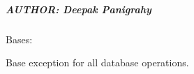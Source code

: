 \documentclass[letterpaper,10pt,english]{sphinxmanual}
\begin{document}
\subparagraph{AUTHOR: Deepak Panigrahy}
\label{\detokenize{core.database.base:author-deepak-panigrahy}}

\begin{fulllineitems}
\label{\detokenize{core.database.base:core.database.base.DatabaseError}}
\pysigstartsignatures
\pysigline
{}
\pysigstopsignatures
\sphinxAtStartPar
Bases: 

\sphinxAtStartPar
Base exception for all database operations.

\end{fulllineitems}

\end{document}
